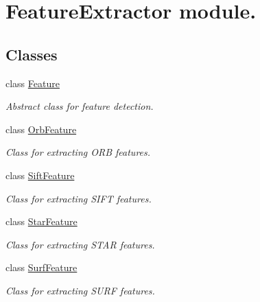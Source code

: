 \hypertarget{group___feature_extractor}{\section{Feature\-Extractor module.}
\label{group___feature_extractor}
}
\subsection*{Classes}
\begin{DoxyCompactItemize}
\item 
class \hyperlink{class_feature}{Feature}
\begin{DoxyCompactList}\small\item\em Abstract class for feature detection. \end{DoxyCompactList}\item 
class \hyperlink{class_orb_feature}{Orb\-Feature}
\begin{DoxyCompactList}\small\item\em Class for extracting O\-R\-B features. \end{DoxyCompactList}\item 
class \hyperlink{class_sift_feature}{Sift\-Feature}
\begin{DoxyCompactList}\small\item\em Class for extracting S\-I\-F\-T features. \end{DoxyCompactList}\item 
class \hyperlink{class_star_feature}{Star\-Feature}
\begin{DoxyCompactList}\small\item\em Class for extracting S\-T\-A\-R features. \end{DoxyCompactList}\item 
class \hyperlink{class_surf_feature}{Surf\-Feature}
\begin{DoxyCompactList}\small\item\em Class for extracting S\-U\-R\-F features. \end{DoxyCompactList}\end{DoxyCompactItemize}
